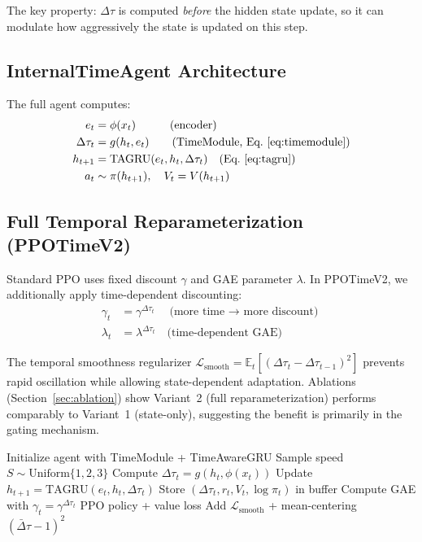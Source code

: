 \documentclass[10pt,twocolumn]{article}
\newcommand{\deltatau}{\Delta\tau}
\theoremstyle{plain}
\theoremstyle{definition}
\begin{document}
The key property: $\deltatau$ is computed \emph{before} the hidden state update,
so it can modulate how aggressively the state is updated on this step.

\subsection{InternalTimeAgent Architecture}

The full agent computes:
\begin{align}
  e_t &= \phi(x_t) \quad\quad\quad\text{(encoder)} \nonumber \\
  \deltatau_t &= g(h_t, e_t) \quad\quad\text{(TimeModule, Eq.~\ref{eq:timemodule})} \nonumber \\
  h_{t+1} &= \mathrm{TAGRU}(e_t, h_t, \deltatau_t) \quad\text{(Eq.~\ref{eq:tagru})} \nonumber \\
  a_t &\sim \pi(h_{t+1}), \quad V_t = V(h_{t+1})
\end{align}

\subsection{Full Temporal Reparameterization (PPOTimeV2)}

Standard PPO uses fixed discount $\gamma$ and GAE parameter $\lambda$.
In PPOTimeV2, we additionally apply time-dependent discounting:
\begin{align}
  \gamma_t &= \gamma^{\deltatau_t} \quad\text{(more time $\to$ more discount)} \\
  \lambda_t &= \lambda^{\deltatau_t} \quad\text{(time-dependent GAE)}
\end{align}

The temporal smoothness regularizer $\mathcal{L}_\text{smooth} =
\mathbb{E}_t[(\deltatau_t - \deltatau_{t-1})^2]$ prevents rapid oscillation
while allowing state-dependent adaptation. Ablations (Section~\ref{sec:ablation})
show Variant~2 (full reparameterization) performs comparably to Variant~1 (state-only),
suggesting the benefit is primarily in the gating mechanism.

\begin{algorithm}[t]
\caption{InternalTimeAgent Training (PPOTimeV2)}
\label{alg:ppo}
\begin{algorithmic}[1]
\STATE Initialize agent with TimeModule + TimeAwareGRU
  \STATE Sample speed $S \sim \mathrm{Uniform}\{1,2,3\}$
    \STATE Compute $\deltatau_t = g(h_t, \phi(x_t))$
    \STATE Update $h_{t+1} = \mathrm{TAGRU}(e_t, h_t, \deltatau_t)$
    \STATE Store $(\deltatau_t, r_t, V_t, \log\pi_t)$ in buffer
  \ENDFOR
  \STATE Compute GAE with $\gamma_t = \gamma^{\deltatau_t}$
    \STATE PPO policy + value loss
    \STATE Add $\mathcal{L}_\text{smooth}$ + mean-centering $({\bar\deltatau} - 1)^2$
  \ENDFOR
\ENDFOR
\end{algorithmic}
\end{algorithm}
\end{document}
